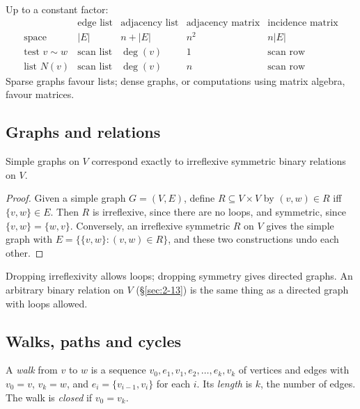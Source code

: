 \begin{note}
Up to a constant factor:
\[
\begin{array}{l|cccc}
 & \text{edge list} & \text{adjacency list} & \text{adjacency matrix} & \text{incidence matrix}\\\hline
\text{space} & |E| & n+|E| & n^2 & n|E|\\
\text{test } v\sim w & \text{scan list} & \deg(v) & 1 & \text{scan row}\\
\text{list } N(v) & \text{scan list} & \deg(v) & n & \text{scan row}
\end{array}
\]
Sparse graphs favour lists; dense graphs, or computations using matrix algebra, favour matrices.
\end{note}

\subsection{Graphs and relations}
\label{sec:11-3}

\begin{proposition}
Simple graphs on $V$ correspond exactly to irreflexive symmetric binary relations on $V$.
\end{proposition}
\begin{proof}
Given a simple graph $G=(V,E)$, define $R\subseteq V\times V$ by $(v,w)\in R$ iff $\{v,w\}\in E$. Then $R$ is irreflexive, since there are no loops, and symmetric, since $\{v,w\}=\{w,v\}$. Conversely, an irreflexive symmetric $R$ on $V$ gives the simple graph with $E=\{\{v,w\}:(v,w)\in R\}$, and these two constructions undo each other.
\end{proof}

\begin{note}
Dropping irreflexivity allows loops; dropping symmetry gives directed graphs. An arbitrary binary relation on $V$ (\S\ref{sec:2-13}) is the same thing as a directed graph with loops allowed.
\end{note}

\subsection{Walks, paths and cycles}
\label{sec:11-8}

\begin{definition}
\label{def:walk-closed}\label{def:walk}
A \emph{walk} from $v$ to $w$ is a sequence $v_0,e_1,v_1,e_2,\dots,e_k,v_k$ of vertices and edges with $v_0=v$, $v_k=w$, and $e_i=\{v_{i-1},v_i\}$ for each $i$. Its \emph{length} is $k$, the number of edges. The walk is \emph{closed} if $v_0=v_k$.
\end{definition}

